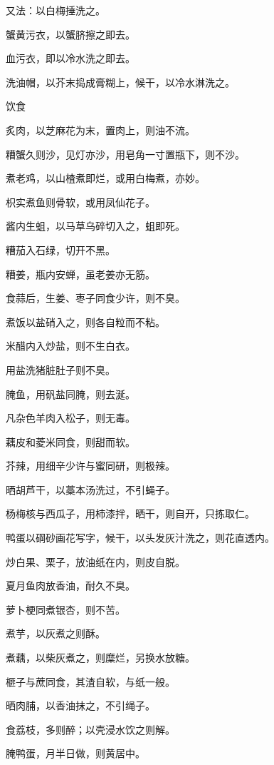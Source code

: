 \documentclass[a4paper,12pt,UTF8,twoside]{ctexbook}
\begin{document}
    又法：以白梅捶洗之。
    
    蟹黄污衣，以蟹脐擦之即去。
    
    血污衣，即以冷水洗之即去。
    
    洗油帽，以芥末捣成膏糊上，候干，以冷水淋洗之。
    
    饮食
    
    炙肉，以芝麻花为末，置肉上，则油不流。
    
    糟蟹久则沙，见灯亦沙，用皂角一寸置瓶下，则不沙。
    
    煮老鸡，以山楂煮即烂，或用白梅煮，亦妙。
    
    枳实煮鱼则骨软，或用凤仙花子。
    
    酱内生蛆，以马草乌碎切入之，蛆即死。
    
    糟茄入石绿，切开不黑。
    
    糟姜，瓶内安蝉，虽老姜亦无筋。
    
    食蒜后，生姜、枣子同食少许，则不臭。
    
    煮饭以盐硝入之，则各自粒而不粘。
    
    米醋内入炒盐，则不生白衣。
    
    用盐洗猪脏肚子则不臭。
    
    腌鱼，用矾盐同腌，则去涎。
    
    凡杂色羊肉入松子，则无毒。
    
    藕皮和菱米同食，则甜而软。
    
    芥辣，用细辛少许与蜜同研，则极辣。
    
    晒胡芦干，以藁本汤洗过，不引蝇子。
    
    杨梅核与西瓜子，用柿漆拌，晒干，则自开，只拣取仁。
    
    鸭蛋以碙砂画花写字，候干，以头发灰汁洗之，则花直透内。
    
    炒白果、栗子，放油纸在内，则皮自脱。
    
    夏月鱼肉放香油，耐久不臭。
    
    萝卜梗同煮银杏，则不苦。
    
    煮芋，以灰煮之则酥。
    
    煮藕，以柴灰煮之，则糜烂，另换水放糖。
    
    榧子与蔗同食，其渣自软，与纸一般。
    
    晒肉脯，以香油抹之，不引绳子。
    
    食荔枝，多则醉；以壳浸水饮之则解。
    
    腌鸭蛋，月半日做，则黄居中。
    
\end{document}
